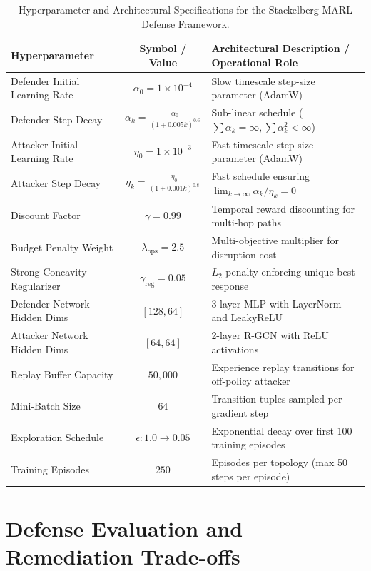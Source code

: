 \begin{table}[ht]
\centering
\small
\renewcommand{\arraystretch}{1.2}
\caption{Hyperparameter and Architectural Specifications for the Stackelberg MARL Defense Framework.}
\label{tab:marl_hyperparams}
\begin{tabularx}{\textwidth}{l c X}
\toprule
\textbf{Hyperparameter} & \textbf{Symbol / Value} & \textbf{Architectural Description / Operational Role} \\
\midrule
Defender Initial Learning Rate & $\alpha_0 = 1 \times 10^{-4}$ & Slow timescale step-size parameter (AdamW) \\
Defender Step Decay & $\alpha_k = \frac{\alpha_0}{(1 + 0.005 k)^{0.6}}$ & Sub-linear schedule ($\sum \alpha_k = \infty, \sum \alpha_k^2 < \infty$) \\
Attacker Initial Learning Rate & $\eta_0 = 1 \times 10^{-3}$ & Fast timescale step-size parameter (AdamW) \\
Attacker Step Decay & $\eta_k = \frac{\eta_0}{(1 + 0.001 k)^{0.8}}$ & Fast schedule ensuring $\lim_{k \to \infty} \alpha_k / \eta_k = 0$ \\
Discount Factor & $\gamma = 0.99$ & Temporal reward discounting for multi-hop paths \\
Budget Penalty Weight & $\lambda_{\text{ops}} = 2.5$ & Multi-objective multiplier for disruption cost \\
Strong Concavity Regularizer & $\gamma_{\text{reg}} = 0.05$ & $L_2$ penalty enforcing unique best response \\
Defender Network Hidden Dims & $[128, 64]$ & 3-layer MLP with LayerNorm and LeakyReLU \\
Attacker Network Hidden Dims & $[64, 64]$ & 2-layer R-GCN with ReLU activations \\
Replay Buffer Capacity & $50{,}000$ & Experience replay transitions for off-policy attacker \\
Mini-Batch Size & $64$ & Transition tuples sampled per gradient step \\
Exploration Schedule & $\epsilon: 1.0 \to 0.05$ & Exponential decay over first 100 training episodes \\
Training Episodes & $250$ & Episodes per topology (max 50 steps per episode) \\
\bottomrule
\end{tabularx}
\end{table}

\section{Defense Evaluation and Remediation Trade-offs}
\label{sec:game_simulation}

